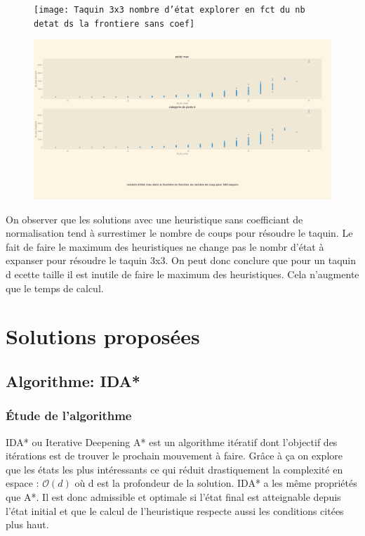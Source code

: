 \documentclass[a4paper, 12pt]{article}
\begin{document}
\begin{figure}[H]
    \centering
    \texttt{[image: Taquin 3x3 nombre d'état explorer en fct du nb detat ds la frontiere sans coef]}
\end{figure}
\begin{figure}[H]
    \centering
    \includegraphics[width=\textwidth]{Taquin 3xnb etat dans la frontiere en fct du nb de coups}
\end{figure}

On observer que les solutions avec une heuristique sans coefficiant de normalisation tend à surrestimer le nombre de coups pour résoudre le taquin.  Le fait de faire le maximum des heuristiques ne change pas le nombr d'état à expanser pour résoudre le taquin 3x3. On peut donc conclure que pour un taquin d ecette taille il est inutile de faire le maximum des heuristiques. Cela n'augmente que le temps de calcul.

\section{Solutions proposées}

\subsection{Algorithme: IDA*}

\subsubsection{Étude de l'algorithme}

IDA* ou Iterative Deepening A* est un algorithme itératif dont l'objectif des itérations est de trouver le prochain mouvement à faire.
Grâce à ça on explore que les états les plus intéressants ce qui réduit drastiquement la complexité en espace : $\mathcal{O}(d)$ où d est la profondeur de la solution.
IDA* a les même propriétés que A*. Il est donc admissible et optimale si l'état final est atteignable depuis l'état initial et que le calcul de l'heuristique respecte aussi les conditions citées plus haut.
\end{document}
